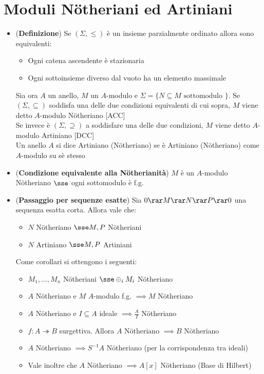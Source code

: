 \documentclass[a4paper,NoNotes,GeneralMath]{stdmdoc}
\newcommand{\srar}{\twoheadrightarrow}
\begin{document}
	\section*{Moduli Nötheriani ed Artiniani}
	\begin{itemize}
		\item ({\bf Definizione}) Se $(\Sigma, \le)$ è un insieme parzialmente ordinato allora sono equivalenti:
			\begin{itemize}
				\item Ogni catena ascendente è stazionaria
				\item Ogni sottoinsieme diverso dal vuoto ha un elemento massimale
			\end{itemize}
			Sia ora $A$ un anello, $M$ un $A$-modulo e $\Sigma = \{ N \subseteq M \text{ sottomodulo } \}$. Se $(\Sigma, \subseteq)$ soddisfa una delle due condizioni equivalenti di cui sopra, $M$ viene detto $A$-modulo Nötheriano [ACC] \\
			Se invece è $(\Sigma, \supseteq)$ a soddisfare una delle due condizioni, $M$ viene detto $A$-modulo Artiniano [DCC] \\
			Un anello $A$ si dice Artiniano (Nötheriano) se è Artiniano (Nötheriano) come $A$-modulo su sè stesso
		\item ({\bf Condizione equivalente alla Nötherianità}) $M$ è un $A$-modulo Nötheriano $\sse$ ogni sottomodulo è f.g.
		\item ({\bf Passaggio per sequenze esatte}) Sia $0 \rar M \rar N \rar P \rar 0$ una sequenza esatta corta. Allora vale che:
			\begin{itemize}
				\item $N$ Nötheriano $\sse M, P$ Nötheriani
				\item $N$ Artiniano $\sse M, P$ Artiniani
			\end{itemize}
			Come corollari si ottengono i seguenti:
			\begin{itemize}
				\item $M_1, \ldots, M_n$ Nötheriani $\sse \oplus_i M_i$ Nötheriano
				\item $A$ Nötheriano e $M$ $A$-modulo f.g. $\implies M$ Nötheriano
				\item $A$ Nötheriano e $I \subseteq A$ ideale $\implies \frac{A}{I}$ Nötheriano
				\item $f: A \srar B$ surgettiva. Allora $A$ Nötheriano $\implies B$ Nötheriano
				\item $A$ Nötheriano $\implies S^{-1}A$ Nötheriano (per la corrispondenza tra ideali)
				\item Vale inoltre che $A$ Nötheriano $\implies A[x]$ Nötheriano (Base di Hilbert)

\end{itemize}
\end{itemize}
\end{document}

